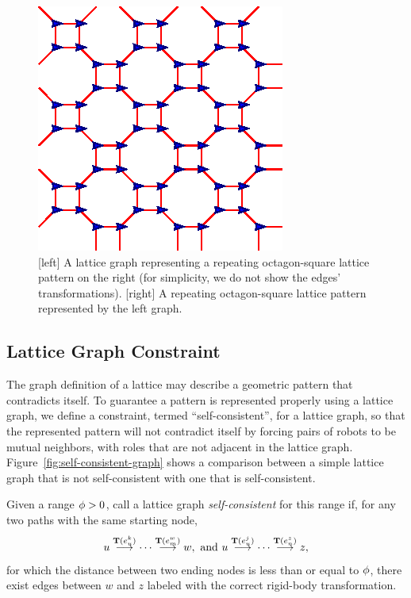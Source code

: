 \begin{figure}
    \centering
    \begin{minipage}[b]{0.45\linewidth}
        \centering
        
    \end{minipage}
    \begin{minipage}[b]{0.45\linewidth}
        \centering
        \includegraphics[scale=0.95]{figs/octsq-lat}
    \end{minipage}
    \caption{[left] A lattice graph representing a repeating octagon-square lattice pattern on the right (for simplicity, we do not show the edges' transformations). [right] A repeating octagon-square lattice pattern represented by the left graph.}
    \label{fig:octagonsquare}
\end{figure}



\subsection{Lattice Graph Constraint}
The graph definition of a lattice may describe a geometric pattern that contradicts itself. 
To guarantee a pattern is represented properly using a lattice graph, we define a constraint, termed ``self-consistent'', for a lattice graph, so that the represented pattern will not contradict itself by forcing pairs of robots to be mutual neighbors, with roles that are not adjacent in the lattice graph. 
%
Figure~\ref{fig:self-consistent-graph} shows a comparison between a simple
lattice graph that is not self-consistent with one that is self-consistent.


\begin{defn}
  \label{def:selfconsistent}
  Given a range $\phi > 0$, call a lattice graph \textit{self-consistent} for
  this range if, for any two paths with the same starting node,
  $$ {u}\overset{\mathbf{T}(e_u^{k})}{\longrightarrow}{\cdots}\overset{\mathbf{T}(e_m^{w})}{\longrightarrow}{w}, \mbox{ and } 
    {u}\overset{\mathbf{T}(e_u^{j})}{\longrightarrow}{\cdots}\overset{\mathbf{T}(e_n^{z})}{\longrightarrow}{z}, $$
  for which the distance between two ending nodes is less than or equal to
  $\phi$, there exist edges between $w$ and $z$ labeled with the correct rigid-body transformation.
\end{defn}


